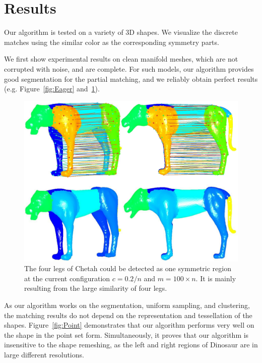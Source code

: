 \section{Results}
\label{sec:result}

Our algorithm is tested on a variety of 3D shapes.
We visualize the discrete matches using the similar color as the corresponding symmetry parts.

We first show experimental results on clean manifold meshes, which are not corrupted with noise, and are complete.
For such models, our algorithm provides good segmentation for the partial matching, and we reliably obtain perfect results (e.g. Figure~\ref{fig:Eager} and~\ref{fig:Tiger}).

\begin{figure}[t]
\centering
  \includegraphics[width=0.99\linewidth]{figures/chetah.pdf}
  \caption{The four legs of Chetah could be detected as one symmetric region at the current configuration $c=0.2/n$ and $m=100 \times n$.
  It is mainly resulting from the large similarity of four legs.}
\label{fig:Tiger}
\end{figure}

As our algorithm works on the segmentation, uniform sampling, and clustering, the matching results do not depend on the representation and tessellation of the shapes.
Figure~\ref{fig:Point} demonstrates that our algorithm performs very well on the shape in the point set form.
Simultaneously, it proves that our algorithm is insensitive to the shape remeshing, as the left and right regions of Dinosaur are in large different resolutions.

